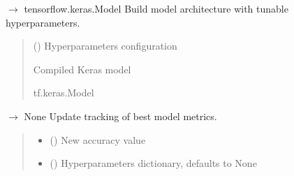 \documentclass[letterpaper,10pt,english]{sphinxmanual}
\begin{document}
\begin{fulllineitems}
\label{\detokenize{autoapi/src/CNNTrainer/index:src.CNNTrainer.__build_model}}
\pysigstartsignatures
\pysiglinewithargsret
{}
{}
{{ $\rightarrow$ tensorflow.keras.Model}}
\pysigstopsignatures
\sphinxAtStartPar
Build model architecture with tunable hyperparameters.
\begin{quote}\begin{description}
\sphinxAtStartPar
{} () \textendash{} Hyperparameters configuration

\sphinxAtStartPar
Compiled Keras model

\sphinxAtStartPar
tf.keras.Model

\end{description}\end{quote}

\end{fulllineitems}


\begin{fulllineitems}
\label{\detokenize{autoapi/src/CNNTrainer/index:src.CNNTrainer.__update_best_args}}
\pysigstartsignatures
\pysiglinewithargsret
{}
{\sphinxparamcomma {}}
{{ $\rightarrow$ None}}
\pysigstopsignatures
\sphinxAtStartPar
Update tracking of best model metrics.
\begin{quote}\begin{description}
\begin{itemize}
\item {} 
\sphinxAtStartPar
{} () \textendash{} New accuracy value

\item {} 
\sphinxAtStartPar
{} (\sphinxstyleliteralemphasis{\sphinxupquote{, }}) \textendash{} Hyperparameters dictionary, defaults to None

\end{itemize}

\end{description}\end{quote}

\end{fulllineitems}
\end{document}
